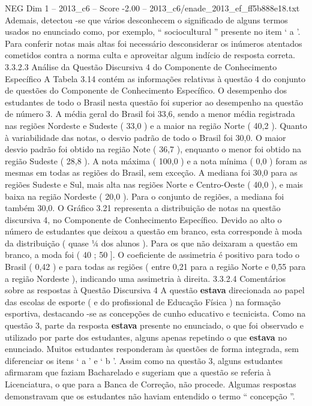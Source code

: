 \begin{textsample}{NEG Dim 1 – 2013\_c6 – Score -2.00 – 2013\_c6/enade\_2013\_ef\_ff5b888e18.txt}
Ademais, detectou -se que vários desconhecem o significado de alguns termos usados no enunciado como, por exemplo, “ sociocultural ” presente no item ‘ a ’.
Para conferir notas mais altas foi necessário desconsiderar os inúmeros atentados cometidos contra a norma culta e aproveitar algum indício de resposta correta. 3.3.2.3 Análise da Questão Discursiva 4 do Componente de Conhecimento Específico A Tabela 3.14 contém as informações relativas à questão 4 do conjunto de questões do Componente de Conhecimento Específico.
O desempenho dos estudantes de todo o Brasil nesta questão foi superior ao desempenho na questão de número 3.
A média geral do Brasil foi 33,6, sendo a menor média registrada nas regiões Nordeste e Sudeste ( 33,0 ) e a maior na região Norte ( 40,2 ).
Quanto à variabilidade das notas, o desvio padrão de todo o Brasil foi 30,0.
O maior desvio padrão foi obtido na região Note ( 36,7 ), enquanto o menor foi obtido na região Sudeste ( 28,8 ).
A nota máxima ( 100,0 ) e a nota mínima ( 0,0 ) foram as mesmas em todas as regiões do Brasil, sem exceção.
A mediana foi 30,0 para as regiões Sudeste e Sul, mais alta nas regiões Norte e Centro-Oeste ( 40,0 ), e mais baixa na região Nordeste ( 20,0 ).
Para o conjunto de regiões, a mediana foi também 30,0.
O Gráfico 3.21 representa a distribuição de notas na questão discursiva 4, no Componente de Conhecimento Específico.
Devido ao alto o número de estudantes que deixou a questão em branco, esta corresponde à moda da distribuição ( quase ¼ dos alunos ).
Para os que não deixaram a questão em branco, a moda foi ( 40 ; 50 ].
O coeficiente de assimetria é positivo para todo o Brasil ( 0,42 ) e para todas as regiões ( entre 0,21 para a região Norte e 0,55 para a região Nordeste ), indicando uma assimetria à direita. 3.3.2.4 Comentários sobre as respostas à Questão Discursiva 4 A questão \textbf{estava} direcionada ao papel das escolas de esporte ( e do profissional de Educação Física ) na formação esportiva, destacando -se as concepções de cunho educativo e tecnicista.
Como na questão 3, parte da resposta \textbf{estava} presente no enunciado, o que foi observado e utilizado por parte dos estudantes, alguns apenas repetindo o que \textbf{estava} no enunciado.
Muitos estudantes responderam às questões de forma integrada, sem diferenciar os itens ‘ a ’ e ‘ b ’.
Assim como na questão 3, alguns estudantes afirmaram que faziam Bacharelado e sugeriam que a questão se referia à Licenciatura, o que para a Banca de Correção, não procede.
Algumas respostas demonstravam que os estudantes não haviam entendido o termo “ concepção ”.

\end{textsample}
